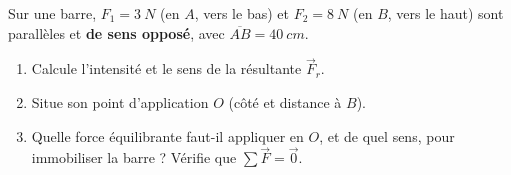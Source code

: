 \documentclass[11pt,a4paper]{article}
\newcommand{\vv}[1]{\vec{#1}}\newcommand{\ds}{\displaystyle}
\begin{document}
\begin{exo}
Sur une barre, $F_1=\qty{3}{N}$ (en $A$, vers le bas) et $F_2=\qty{8}{N}$ (en $B$, vers le haut) sont
parallèles et \textbf{de sens opposé}, avec $\overline{AB}=\qty{40}{cm}$.
\begin{enumerate}[label=\alph*)]
  \item Calcule l'intensité et le sens de la résultante $\vv F_r$.
  \item Situe son point d'application $O$ (côté et distance à $B$).
  \item Quelle force équilibrante faut-il appliquer en $O$, et de quel sens, pour immobiliser la
        barre ? Vérifie que $\sum\vv F=\vv 0$.
\end{enumerate}
\end{exo}
\end{document}
